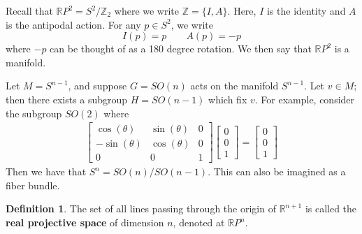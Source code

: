 \documentclass[12pt,letterpaper,boxed]{maths_v5}
\newcommand{\zz}{\mathbb{Z}}
\newcommand{\rr}{\mathbb{R}}
\theoremstyle{definition}
\newtheorem{definition}{Definition}[section]
\begin{document}
    \begin{example}
        Recall that $\rr P^2 = S^2/\zz_2$ where we write $\zz = \{I, A\}$. 
        Here, $I$ is the identity and $A$ is the antipodal action. For any $p \in S^2$, we 
        write 
        \[
            I(p) = p \qquad A(p) = -p
        \]
        where $-p$ can be thought of as a 180 degree rotation. We then say that $\rr P^2$ 
        is a manifold.
    \end{example}

    \begin{example}
        Let $M = S^{n-1}$, and suppose $G = SO(n)$ acts on the manifold $S^{n-1}$. 
        Let $v \in M$; then there exists a subgroup $H = SO(n-1)$ which fix $v$. For example, 
        consider the subgroup  $SO(2)$ where   
        \begin{align*}
            \begin{bmatrix}
                \cos(\theta)& \sin(\theta)& 0 \\
                -\sin(\theta)& \cos(\theta)& 0 \\
                0 & 0 & 1
            \end{bmatrix}
            \begin{bmatrix}
                0 \\
                0\\
                1
            \end{bmatrix}
            = 
            \begin{bmatrix}
                0 \\
                0\\
                1
            \end{bmatrix}
        \end{align*}
        Then we have that  $S^{n} = SO(n)/SO(n-1).$ This can also be imagined as a 
        fiber bundle. 
        \begin{center}
        \end{center}
    \end{example}

    \begin{definition}
        The set of all lines passing through the origin of $\rr^{n+1}$ is called 
        the \textbf{real projective space} of dimension $n$, denoted at $\rr P^n$.
    \end{definition}
\end{document}

